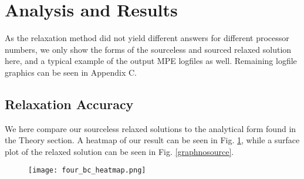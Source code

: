 \documentclass[reprint, amsmath, amssymb, aps, floatfix]{revtex4-1}
\begin{document}
\section{Analysis and Results}

As the relaxation method did not yield different answers for different processor numbers, we only show the forms of the sourceless and sourced relaxed solution here, and a typical example of the output MPE logfiles as well. Remaining logfile graphics can be seen in Appendix C.

\subsection{Relaxation Accuracy}

We here compare our sourceless relaxed solutions to the analytical form found in the Theory section. A heatmap of our result can be seen in Fig. \ref{heatmapnosource}, while a surface plot of the relaxed solution can be seen in Fig. \ref{graphnosource}.

\begin{figure}
	\texttt{[image: four\_bc\_heatmap.png]}
	\label{heatmapnosource}
\end{figure}
\end{document}
